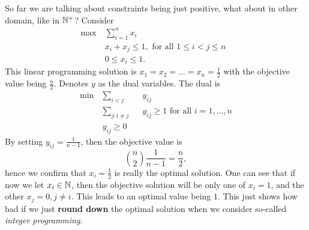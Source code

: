 \hr
So far we are talking about constraints being just positive, what about in other domain, like in \(\mathbb{\MakeUppercase{N}}^+\)?
Consider
\begin{align*}
	\max~ & \sum\limits_{i=1}^{n} x_{i}                              \\
	      & x_{i}+x_{j}\leq 1, \text{ for all \(1\leq i< j\leq n\) } \\
	      & 0\leq x_{i}\leq 1.
\end{align*}
This linear programming solution is \(x_1 = x_2 = \ldots  = x_n = \frac{1}{2}\) with the objective value being \(\frac{n}{2}\).
Denotes \(y\) as the dual variables. The dual is
\[
	\begin{alignedat}{3}
		\min~ & \sum\limits_{i<j}            && y_{ij}                                             \\
		& \sum\limits_{j\colon i\neq j} && y_{ij}\geq 1 \text{ for all \(i = 1, \ldots , n\)} \\
		& y_{ij}\geq 0
	\end{alignedat}
\]
By setting \(y_{ij} = \frac{1}{n-1}\), then the objective value is
\[
	\binom{n}{2}\frac{1}{n-1} = \frac{n}{2},
\]
hence we confirm that \(x_{i} = \frac{1}{2}\) is really the optimal solution. One can see that if now we let \(x_{i}\in\mathbb{\MakeUppercase{N}}\), then
the objective solution will be only one of \(x_{i} = 1\), and the other \(x_{j} = 0, j\neq i\). This leads to an optimal value being
\(1\). This just shows how bad if we just \textbf{round down} the optimal solution when we consider so-called \emph{integer programming}.